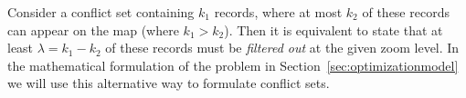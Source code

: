 

Consider a conflict set containing $k_1$ records, where at most $k_2$ of these records can appear on the map (where $k_1 > k_2$). Then it is equivalent to state that at least $\lambda = k_1 - k_2$ of these records must be \emph{filtered out} at the given zoom level. In the mathematical formulation of the problem in Section~\ref{sec:optimizationmodel} we will use this alternative way to formulate conflict sets.



